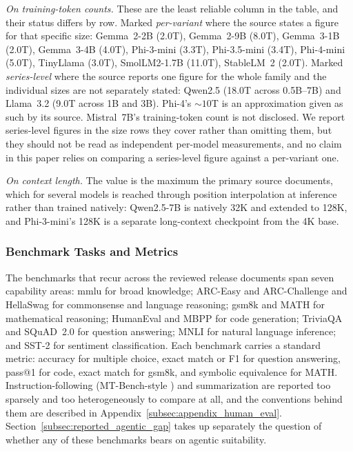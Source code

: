\begin{table}[ht]
{\textit{On training-token counts.} These are the least reliable column in the
table, and their status differs by row. Marked \emph{per-variant} where the
source states a figure for that specific size: Gemma~2-2B (2.0T), Gemma~2-9B
(8.0T), Gemma~3-1B (2.0T), Gemma~3-4B (4.0T), Phi-3-mini (3.3T), Phi-3.5-mini
(3.4T), Phi-4-mini (5.0T), TinyLlama (3.0T), SmolLM2-1.7B (11.0T), StableLM~2
(2.0T). Marked \emph{series-level} where the source reports one figure for the
whole family and the individual sizes are not separately stated: Qwen2.5
(18.0T across 0.5B--7B) and Llama~3.2 (9.0T across 1B and 3B). Phi-4's
${\sim}10$T is an approximation given as such by its source. Mistral~7B's
training-token count is not disclosed. We report series-level figures in the
size rows they cover rather than omitting them, but they should not be read as
independent per-model measurements, and no claim in this paper relies on
comparing a series-level figure against a per-variant one.

\textit{On context length.} The value is the maximum the primary source
documents, which for several models is reached through position interpolation at
inference rather than trained natively: Qwen2.5-7B is natively 32K and extended
to 128K, and Phi-3-mini's 128K is a separate long-context checkpoint from the 4K
base.\par}
\end{table}

\subsubsection{Benchmark Tasks and Metrics}
\label{subsec:reported_benchmarks}
The benchmarks that recur across the reviewed release documents span seven
capability areas: \gls{mmlu} \citep{hendrycks2021mmlu} for broad knowledge;
ARC-Easy and ARC-Challenge \citep{clark2018arc} and HellaSwag
\citep{zellers2019hellaswag} for commonsense and language reasoning; \gls{gsm8k}
\citep{cobbe2021gsm8k} and MATH \citep{hendrycks2021math} for mathematical
reasoning; HumanEval \citep{chen2021humaneval} and MBPP \citep{austin2021mbpp}
for code generation; TriviaQA \citep{joshi2017triviaqa} and SQuAD~2.0
\citep{rajpurkar2018squad2} for question answering; MNLI \citep{williams2018mnli}
for natural language inference; and SST-2 \citep{socher2013sst} for sentiment
classification. Each benchmark carries a standard metric: accuracy for multiple
choice, exact match or F1 for question answering, pass@1 for code, exact match
for \gls{gsm8k}, and symbolic equivalence for MATH. Instruction-following
(MT-Bench-style \citep{zheng2023mtbench}) and summarization are reported too
sparsely and too heterogeneously to compare at all, and the conventions behind
them are described in Appendix~\ref{subsec:appendix_human_eval}. Section~\ref{subsec:reported_agentic_gap}
takes up separately the question of whether any of these benchmarks bears on
agentic suitability.

